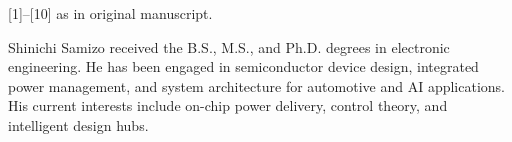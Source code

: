 \documentclass[journal]{IEEEtran}
\begin{document}
\begin{thebibliography}{99}
 [1]--[10] as in original manuscript.
\end{thebibliography}

\begin{IEEEbiography}{Shinichi Samizo}
received the B.S., M.S., and Ph.D. degrees in electronic engineering. He has been engaged in semiconductor device design, integrated power management, and system architecture for automotive and AI applications. His current interests include on-chip power delivery, control theory, and intelligent design hubs.  
\end{IEEEbiography}
\end{document}
